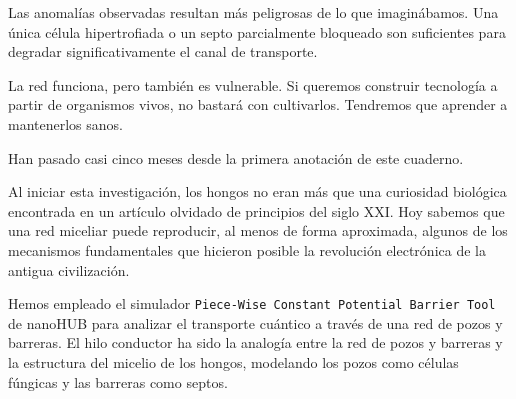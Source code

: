\documentclass[a4paper,12pt]{article}
\begin{document}
Las anomalías observadas resultan más peligrosas de lo que imaginábamos. Una única célula hipertrofiada o un septo parcialmente bloqueado son suficientes para degradar significativamente el canal de transporte.

La red funciona, pero también es vulnerable. Si queremos construir tecnología a partir de organismos vivos, no bastará con cultivarlos. Tendremos que aprender a mantenerlos sanos.



Han pasado casi cinco meses desde la primera anotación de este cuaderno.

Al iniciar esta investigación, los hongos no eran más que una curiosidad biológica encontrada en un artículo olvidado de principios del siglo XXI. Hoy sabemos que una red miceliar puede reproducir, al menos de forma aproximada, algunos de los mecanismos fundamentales que hicieron posible la revolución electrónica de la antigua civilización.

Hemos empleado el simulador \texttt{Piece-Wise Constant Potential Barrier Tool} de nanoHUB \cite{nano} para analizar el transporte cuántico a través de una red de pozos y barreras. El hilo conductor ha sido la analogía entre la red de pozos y barreras y la estructura del micelio de los hongos, modelando los pozos como células fúngicas y las barreras como septos. 

\end{document}
